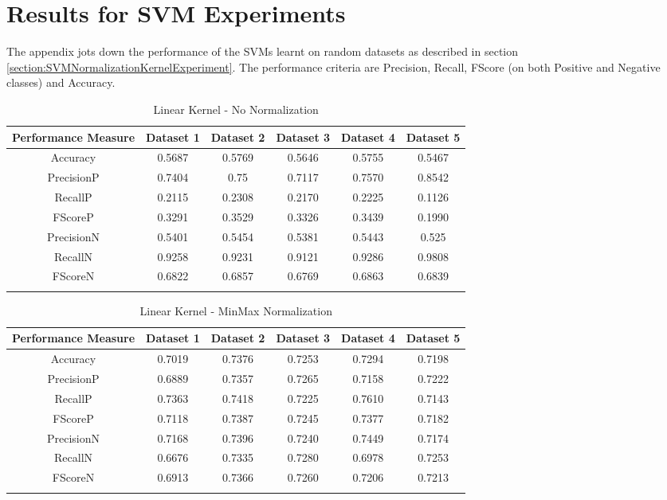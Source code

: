 \chapter{Results for SVM Experiments}
\label{appendix:SVMResults}

The appendix jots down the performance of the SVMs learnt on random datasets as described in section \ref{section:SVMNormalizationKernelExperiment}.
The performance criteria are Precision, Recall, FScore (on both Positive and Negative classes) and Accuracy.

\begin{center}
\begin{longtable}{| c | c | c | c | c | c |}      
    \hline
    Performance Measure & Dataset 1 & Dataset 2 & Dataset 3 & Dataset 4 & Dataset 5 \\ \hline
    Accuracy & 0.5687 & 0.5769 & 0.5646 & 0.5755 & 0.5467 \\ \hline 
    PrecisionP & 0.7404 & 0.75 & 0.7117 & 0.7570 & 0.8542 \\ \hline
    RecallP & 0.2115 & 0.2308 & 0.2170 & 0.2225 & 0.1126 \\ \hline
    FScoreP & 0.3291 & 0.3529 & 0.3326 & 0.3439 & 0.1990 \\ \hline %
    PrecisionN & 0.5401 & 0.5454 & 0.5381 & 0.5443 & 0.525 \\ \hline
    RecallN & 0.9258 & 0.9231 & 0.9121 & 0.9286 & 0.9808 \\ \hline
    FScoreN & 0.6822 & 0.6857 & 0.6769 & 0.6863 & 0.6839 \\ \hline %
    \caption{Linear Kernel - No Normalization}
  \label{tab:LinearKernelNoNormalization}
\end{longtable}
\end{center}

\begin{center}
\begin{longtable}{| c | c | c | c | c | c |}      
    \hline
    Performance Measure & Dataset 1 & Dataset 2 & Dataset 3 & Dataset 4 & Dataset 5 \\ \hline
    Accuracy & 0.7019 & 0.7376 & 0.7253 & 0.7294 & 0.7198 \\ \hline
    PrecisionP & 0.6889 & 0.7357 & 0.7265 & 0.7158 & 0.7222 \\ \hline
    RecallP & 0.7363 & 0.7418 & 0.7225 & 0.7610 & 0.7143 \\ \hline
    FScoreP & 0.7118 & 0.7387 & 0.7245 & 0.7377 & 0.7182 \\ \hline %
    PrecisionN & 0.7168 & 0.7396 & 0.7240 & 0.7449 & 0.7174 \\ \hline
    RecallN & 0.6676 & 0.7335 & 0.7280 & 0.6978 & 0.7253 \\ \hline
    FScoreN & 0.6913 & 0.7366 & 0.7260 & 0.7206 & 0.7213 \\ \hline %
    \caption{Linear Kernel - MinMax Normalization}
  \label{tab:LinearKernelMinMaxNormalization}
\end{longtable}
\end{center}

